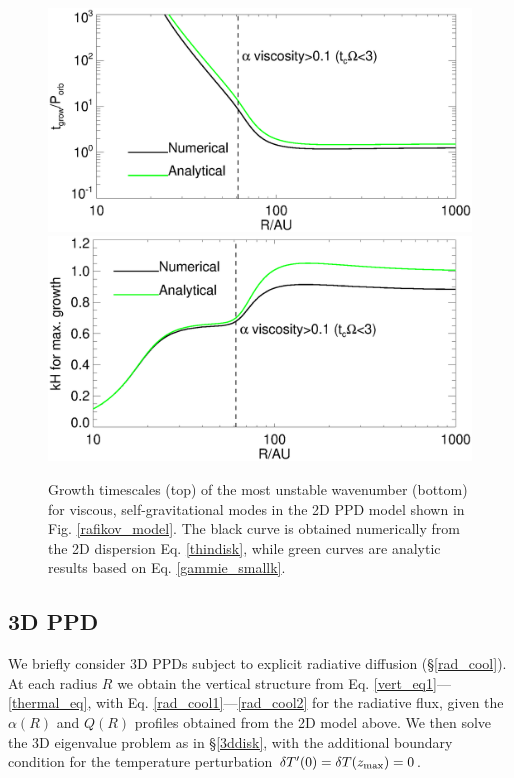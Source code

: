 \begin{figure}
  \includegraphics[width=\linewidth,clip=true,trim=0cm 1.5cm 0cm
    0.0cm]{figures/ppd_2d_growth}\\
  \includegraphics[width=\linewidth,clip=true,trim=0cm 0cm 0cm
    0.8cm]{figures/ppd_2d_maxk}
  \caption{Growth timescales (top) of the most unstable
    wavenumber (bottom) for viscous,
    self-gravitational modes in the 2D PPD model shown in
    Fig. \ref{rafikov_model}. 
    The black curve is obtained numerically
    from the 2D dispersion Eq. \ref{thindisk}, while green curves 
    are analytic results based on Eq. \ref{gammie_smallk}. 
    \label{rafikov_growth}}
\end{figure}


\subsection{3D PPD}
We briefly consider 3D PPDs subject to explicit radiative diffusion 
(\S\ref{rad_cool}). At each radius $R$ we obtain the vertical
structure from Eq. \ref{vert_eq1}---\ref{thermal_eq}, with 
Eq. \ref{rad_cool1}---\ref{rad_cool2} for the radiative flux, given
the $\alpha(R)$ and $Q(R)$ profiles obtained from the 2D model
above. We then solve the 3D eigenvalue problem as in
\S\ref{3ddisk}, with the additional boundary condition for the temperature 
perturbation $\delta T^\prime(0) = \delta T(z_\mathrm{max}) = 0$.    

